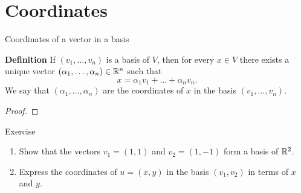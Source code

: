 \documentclass{beamer}
\begin{document}
\section{Coordinates}
\begin{frame}[t]{Coordinates of a vector in a basis}
	\grid
	\vspace{-0.4cm}
	\begin{block}{\bf Definition}
		If $(v_1, \dots, v_n)$ is a basis of $V$, then for every $x \in V$ there exists a unique vector $(\alpha_1, \dots, \alpha_n) \in \mathbb{R}^n$ such that
		$$
		x = \alpha_1 v_1 + \dots + \alpha_n v_n.
		$$
		We say that $(\alpha_1, \dots, \alpha_n)$ are the coordinates of $x$ in the basis $(v_1, \dots, v_n)$.
	\end{block}
	\pause
	\begin{proof}
		\vspace{2.5cm}
		\vfill
	\end{proof}
\end{frame}

\begin{frame}[t]{Exercise}
	\grid
	\vspace{-0.8cm}
	\begin{exampleblock}{}
		\begin{enumerate}
			\item Show that the vectors $v_1 = (1,1)$ and $v_2=(1,-1)$ form a basis of $\mathbb{R}^2$.
			\item Express the coordinates of $u=(x,y)$ in the basis $(v_1,v_2)$ in terms of $x$ and $y$.
		\end{enumerate}
	\end{exampleblock}
	\pause
\end{frame}
\end{document}
